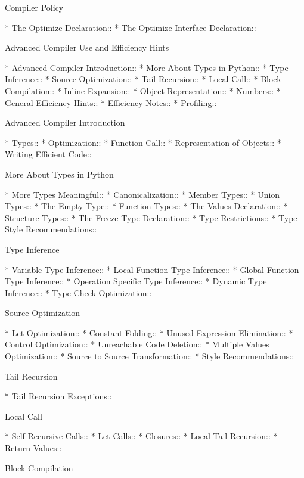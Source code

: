 \begin{menu}
Compiler Policy

* The Optimize Declaration::    
* The Optimize-Interface Declaration::  

Advanced Compiler Use and Efficiency Hints

* Advanced Compiler Introduction::  
* More About Types in Python::  
* Type Inference::              
* Source Optimization::         
* Tail Recursion::              
* Local Call::                  
* Block Compilation::           
* Inline Expansion::            
* Object Representation::       
* Numbers::                     
* General Efficiency Hints::    
* Efficiency Notes::            
* Profiling::                   

Advanced Compiler Introduction

* Types::                       
* Optimization::                
* Function Call::               
* Representation of Objects::   
* Writing Efficient Code::      

More About Types in Python

* More Types Meaningful::       
* Canonicalization::            
* Member Types::                
* Union Types::                 
* The Empty Type::              
* Function Types::              
* The Values Declaration::      
* Structure Types::             
* The Freeze-Type Declaration::  
* Type Restrictions::           
* Type Style Recommendations::  

Type Inference

* Variable Type Inference::     
* Local Function Type Inference::  
* Global Function Type Inference::  
* Operation Specific Type Inference::  
* Dynamic Type Inference::      
* Type Check Optimization::     

Source Optimization

* Let Optimization::            
* Constant Folding::            
* Unused Expression Elimination::  
* Control Optimization::        
* Unreachable Code Deletion::   
* Multiple Values Optimization::  
* Source to Source Transformation::  
* Style Recommendations::       

Tail Recursion

* Tail Recursion Exceptions::   

Local Call

* Self-Recursive Calls::        
* Let Calls::                   
* Closures::                    
* Local Tail Recursion::        
* Return Values::               

Block Compilation


\end{menu}
